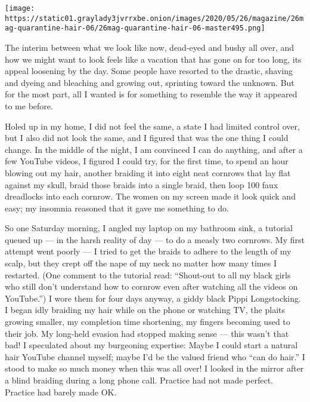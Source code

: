 \texttt{[image: https://static01.graylady3jvrrxbe.onion/images/2020/05/26/magazine/26mag-quarantine-hair-06/26mag-quarantine-hair-06-master495.png]}

The interim between what we look like now, dead-eyed and bushy all over,
and how we might want to look feels like a vacation that has gone on for
too long, its appeal loosening by the day. Some people have resorted to
the drastic, shaving and dyeing and bleaching and growing out, sprinting
toward the unknown. But for the most part, all I wanted is for something
to resemble the way it appeared to me before.

Holed up in my home, I did not feel the same, a state I had limited
control over, but I also did not look the same, and I figured that was
the one thing I could change. In the middle of the night, I am convinced
I can do anything, and after a few YouTube videos, I figured I could
try, for the first time, to spend an hour blowing out my hair, another
braiding it into eight neat cornrows that lay flat against my skull,
braid those braids into a single braid, then loop 100 faux dreadlocks
into each cornrow. The women on my screen made it look quick and easy;
my insomnia reasoned that it gave me something to do.

So one Saturday morning, I angled my laptop on my bathroom sink, a
tutorial queued up --- in the harsh reality of day --- to do a measly
two cornrows. My first attempt went poorly --- I tried to get the braids
to adhere to the length of my scalp, but they crept off the nape of my
neck no matter how many times I restarted. (One comment to the tutorial
read: ``Shout-out to all my black girls who still don't understand how
to cornrow even after watching all the videos on YouTube.'') I wore them
for four days anyway, a giddy black Pippi Longstocking. I began idly
braiding my hair while on the phone or watching TV, the plaits growing
smaller, my completion time shortening, my fingers becoming used to
their job. My long-held evasion had stopped making sense --- this wasn't
that bad! I speculated about my burgeoning expertise: Maybe I could
start a natural hair YouTube channel myself; maybe I'd be the valued
friend who ``can do hair.'' I stood to make so much money when this was
all over! I looked in the mirror after a blind braiding during a long
phone call. Practice had not made perfect. Practice had barely made OK.


